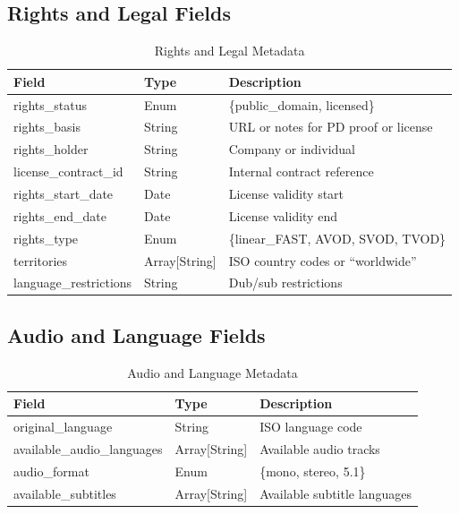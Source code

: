 \documentclass[12pt,letterpaper,twoside]{report}
\begin{document}
\subsection{Rights and Legal Fields}

\begin{table}[H]
\centering
\caption{Rights and Legal Metadata}
\label{tab:meta-rights}
\begin{tabular}{@{}L{4cm}L{3cm}L{6.5cm}@{}}
\toprule
\textbf{Field} & \textbf{Type} & \textbf{Description} \\
\midrule
rights\_\allowbreak status & Enum & \{public\_\allowbreak domain, licensed\} \\
rights\_\allowbreak basis & String & URL or notes for PD proof or license \\
rights\_\allowbreak holder & String & Company or individual \\
license\_\allowbreak contract\_\allowbreak id & String & Internal contract reference \\
rights\_\allowbreak start\_\allowbreak date & Date & License validity start \\
rights\_\allowbreak end\_\allowbreak date & Date & License validity end \\
rights\_\allowbreak type & Enum & \{linear\_\allowbreak FAST, AVOD, SVOD, TVOD\} \\
territories & Array[String] & ISO country codes or ``worldwide'' \\
language\_\allowbreak restrictions & String & Dub/sub restrictions \\
\bottomrule
\end{tabular}
\end{table}

\subsection{Audio and Language Fields}

\begin{table}[H]
\centering
\caption{Audio and Language Metadata}
\label{tab:meta-audio}
\begin{tabular}{@{}L{4.5cm}L{3cm}L{6cm}@{}}
\toprule
\textbf{Field} & \textbf{Type} & \textbf{Description} \\
\midrule
original\_\allowbreak language & String & ISO language code \\
available\_\allowbreak audio\_\allowbreak languages & Array[String] & Available audio tracks \\
audio\_\allowbreak format & Enum & \{mono, stereo, 5.1\} \\
available\_\allowbreak subtitles & Array[String] & Available subtitle languages \\
\bottomrule
\end{tabular}
\end{table}
\end{document}
